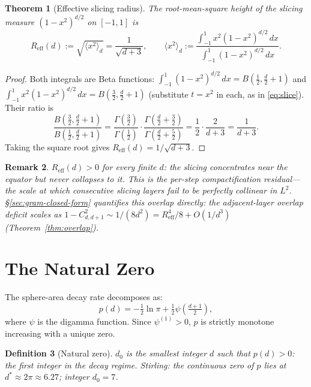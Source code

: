 \documentclass[11pt,a4paper]{article}
\newtheorem{theorem}{Theorem}[section]
\newtheorem{definition}[theorem]{Definition}
\newtheorem{remark}[theorem]{Remark}
\begin{document}
\begin{theorem}[Effective slicing radius]\label{thm:reff}
The root-mean-square height of the slicing measure $(1-x^2)^{d/2}$ on
$[-1,1]$ is
\[
R_{\mathrm{eff}}(d) := \sqrt{\langle x^2\rangle_d} = \frac{1}{\sqrt{d+3}},
\qquad
\langle x^2\rangle_d := \frac{\int_{-1}^{1} x^2(1-x^2)^{d/2}\,dx}
                              {\int_{-1}^{1}(1-x^2)^{d/2}\,dx}.
\]
\end{theorem}

\begin{proof}
Both integrals are Beta functions:
$\int_{-1}^{1}(1-x^2)^{d/2}\,dx = B(\tfrac{1}{2},\tfrac{d}{2}+1)$ and
$\int_{-1}^{1}x^2(1-x^2)^{d/2}\,dx = B(\tfrac{3}{2},\tfrac{d}{2}+1)$
(substitute $t = x^2$ in each, as in \eqref{eq:slice}). Their ratio is
\[
\frac{B(\tfrac{3}{2},\tfrac{d}{2}+1)}{B(\tfrac{1}{2},\tfrac{d}{2}+1)}
= \frac{\Gamma(\tfrac{3}{2})}{\Gamma(\tfrac{1}{2})}\cdot
  \frac{\Gamma(\tfrac{d}{2}+\tfrac{3}{2})}{\Gamma(\tfrac{d}{2}+\tfrac{5}{2})}
= \frac{1}{2}\cdot\frac{2}{d+3}
= \frac{1}{d+3}.
\]
Taking the square root gives $R_{\mathrm{eff}}(d) = 1/\sqrt{d+3}$.
\end{proof}

\begin{remark}
$R_{\mathrm{eff}}(d) > 0$ for every finite $d$: the slicing concentrates
near the equator but never collapses to it. This is the per-step
compactification residual---the scale at which consecutive slicing
layers fail to be perfectly collinear in $L^2$. \S\ref{sec:gram-closed-form}
quantifies this overlap directly: the adjacent-layer overlap deficit
scales as $1 - C^2_{d,d+1}\sim 1/(8d^2) = R_{\mathrm{eff}}^4/8 +
O(1/d^3)$ (Theorem~\ref{thm:overlap}).
\end{remark}

\section{The Natural Zero}\label{sec:the-natural-zero}

The sphere-area decay rate decomposes as:
\[
p(d) = -\tfrac{1}{2}\ln\pi +
\tfrac{1}{2}\psi\!\left(\tfrac{d+1}{2}\right),
\]
where $\psi$ is the digamma function. Since $\psi^{(1)} > 0$, $p$ is
strictly monotone increasing with a unique zero.

\begin{definition}[Natural zero]\label{def:d0}
$d_0$ is the smallest integer $d$ such that $p(d) > 0$: the first
integer in the decay regime. Stirling: the continuous zero of $p$ lies at
$d^*\approx 2\pi\approx 6.27$; integer $d_0 = 7$.
\end{definition}
\end{document}
